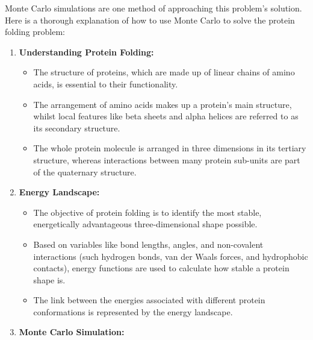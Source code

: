 \documentclass[12pt]{article}
\begin{document}
\par Monte Carlo simulations are one method of approaching this problem's solution. Here is a thorough explanation of how to use Monte Carlo to solve the protein folding problem:
    \begin{enumerate}
        \item \textbf{Understanding Protein Folding:}
        \begin{itemize}
            \item The structure of proteins, which are made up of linear chains of amino acids, is essential to their functionality.
            \item The arrangement of amino acids makes up a protein's main structure, whilst local features like beta sheets and alpha helices are referred to as its secondary structure.
            \item The whole protein molecule is arranged in three dimensions in its tertiary structure, whereas interactions between many protein sub-units are part of the quaternary structure.
        \end{itemize}
        \item \textbf{Energy Landscape: }
        \begin{itemize}
            \item The objective of protein folding is to identify the most stable, energetically advantageous three-dimensional shape possible.
            \item Based on variables like bond lengths, angles, and non-covalent interactions (such hydrogen bonds, van der Waals forces, and hydrophobic contacts), energy functions are used to calculate how stable a protein shape is.
            \item The link between the energies associated with different protein conformations is represented by the energy landscape.
        \end{itemize}
        \item \textbf{Monte Carlo Simulation: }
        \begin{center}
\end{center}
\end{enumerate}
\end{document}
